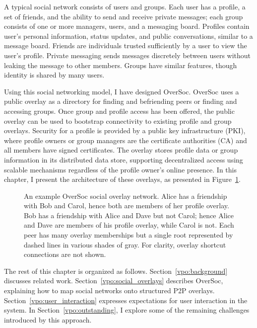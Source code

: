 A typical social network consists of users and groups.  Each user has a
profile, a set of friends, and the ability to send and receive private
messages; each group consists of one or more managers, users, and a messaging
board.  Profiles contain user's personal information, status updates, and
public conversations, similar to a message board.  Friends are individuals
trusted sufficiently by a user to view the user's profile.  Private messaging
sends messages discretely between users without leaking the message to other
members.  Groups have similar features, though identity is shared by many
users.

Using this social networking model, I have designed OverSoc.  OverSoc uses a
public overlay as a directory for finding and befriending peers or finding and
accessing groups.  Once group and profile access has been offered, the public
overlay can be used to bootstrap connectivity to existing profile and group
overlays.  Security for a profile is provided by a public key infrastructure
(PKI), where profile owners or group managers are the certificate authorities
(CA) and all members have signed certificates.  The overlay stores profile data
or group information in its distributed data store, supporting decentralized
access using scalable mechanisms regardless of the profile owner's online
presence.  In this chapter, I present the architecture of these overlays, as
presented in Figure~\ref{fig:spo.system}.

\begin{figure}
\centering
{}
\caption[An example OverSoc social overlay network]{An example OverSoc social
overlay network.  Alice has a friendship with Bob and Carol, hence both are
members of her profile overlay. Bob has a friendship with Alice and Dave but
not Carol; hence Alice and Dave are members of his profile overlay, while Carol
is not.  Each peer has many overlay memberships but a single root represented
by dashed lines in various shades of gray.  For clarity, overlay shortcut
connections are not shown.}
\label{fig:spo.system}
\end{figure}

The rest of this chapter is organized as follows.  Section~\ref{vpo:background}
discusses related work.  Section~\ref{vpo:social_overlays} describes OverSoc,
explaining how to map social networks onto structured P2P overlays.
Section~\ref{vpo:user_interaction} expresses expectations for user interaction in
the system.  In Section~\ref{vpo:outstanding}, I explore some of the remaining
challenges introduced by this approach.  

